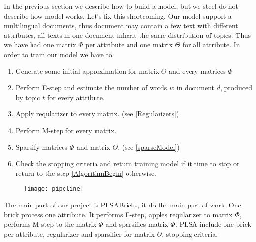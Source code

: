 In the previous section we describe how to build a model, but we steel do not describe how model works. 
Let's fix this shortcoming. Our model support a multilingual documents, thus document may contain a few text with
different attributes, all texts in one document inherit the same distribution of topics. Thus we have had one matrix $\Phi$ per
attribute and one matrix $\Theta$ for all attribute. In order to train our model we have to
\begin{enumerate}
    \item Generate some initial approximation for matrix $\Theta$ and every matrices $\Phi$
    \item \label{AlgorithmBegin} Perform E\--step and estimate the number of words $w$ in document $d$, produced by topic $t$ for every attribute.
    \item Apply reqularizer to every matrix. (see \ref{Regularizers})
    \item Perform M\--step for every matrix.
    \item Sparsify matrices $\Phi$ and matrix $\Theta$. (see \ref{sparseModel})
    \item Check the stopping criteria and return training model if it time to stop or return to the step \ref{AlgorithmBegin} otherwise.   
\end{enumerate}
\begin{figure}[!ht]
    \begin{minipage}{\textwidth}
	\texttt{[image: pipeline]}
    \end{minipage}
\end{figure}
The main part of our project is PLSABricks, it do the main part of work. One brick process one attribute. It performs E\--step, apples
reqularizer to matrix $\Phi$, performs M\--step to the matrix $\Phi$ and sparsifies matrix $\Phi$. PLSA include one brick per attribute,
regularizer and sparsifier for matrix $\Theta$, stopping criteria.  

